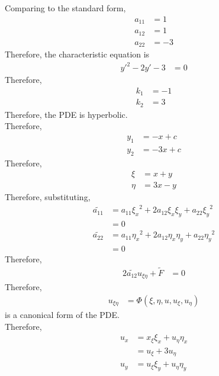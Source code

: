 \documentclass[titlepage, fleqn, a4paper, 12pt, twoside]{article}
\theoremstyle{definition}
\theoremstyle{theorem}
\renewcommand{\tilde}{\widetilde}
\begin{document}
\begin{solution}
	Comparing to the standard form,
	\begin{align*}
		a_{1 1} & = 1 \\
		a_{1 2} & = 1 \\
		a_{2 2} & = -3
	\end{align*}
	Therefore, the characteristic equation is
	\begin{align*}
		{y'}^2 - 2 y' - 3 & = 0
	\end{align*}
	Therefore,
	\begin{align*}
		k_1 & = -1 \\
		k_2 & = 3
	\end{align*}
	Therefore, the PDE is hyperbolic.\\
	Therefore,
	\begin{align*}
		y_1 & = -x + c \\
		y_2 & = -3 x + c
	\end{align*}
	Therefore,
	\begin{align*}
		\xi  & = x + y \\
		\eta & = 3 x - y
	\end{align*}
	Therefore, substituting,
	\begin{align*}
		\tilde{a_{1 1}} & = a_{1 1} {\xi_x}^2 + 2 a_{1 2} \xi_x \xi_y + a_{2 2} {\xi_y}^2     \\
                                & = 0                                                                 \\
		\tilde{a_{2 2}} & = a_{1 1} {\eta_x}^2 + 2 a_{1 2} \eta_x \eta_y + a_{2 2} {\eta_y}^2 \\
                                & = 0
	\end{align*}
	Therefore,
	\begin{align*}
		2 \tilde{a_{1 2}} u_{\xi \eta} + \tilde{F} & = 0
	\end{align*}
	Therefore,
	\begin{align*}
		u_{\xi \eta} & = \Phi(\xi,\eta,u,u_{\xi},u_{\eta})
	\end{align*}
	is a canonical form of the PDE.\\
	Therefore,
	\begin{align*}
		u_x     & = x_{\xi} \xi_x + u_{\eta} \eta_x                                   \\
                        & = u_{\xi} + 3 u_{\eta}                                              \\
		u_y     & = u_{\xi} \xi_y + u_{\eta} \eta_y                                   \\

\end{align*}
\end{solution}
\end{document}

